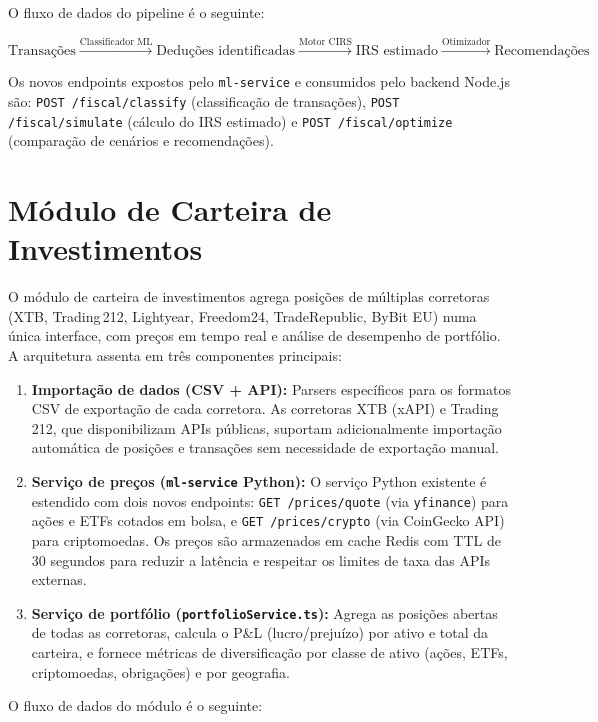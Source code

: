O fluxo de dados do pipeline é o seguinte:

\[
\text{Transações} \xrightarrow{\text{Classificador ML}} \text{Deduções identificadas} \xrightarrow{\text{Motor CIRS}} \text{IRS estimado} \xrightarrow{\text{Otimizador}} \text{Recomendações}
\]

Os novos endpoints expostos pelo \texttt{ml-service} e consumidos pelo backend Node.js são: \texttt{POST /fiscal/classify} (classificação de transações), \texttt{POST /fiscal/simulate} (cálculo do \ac{IRS} estimado) e \texttt{POST /fiscal/optimize} (comparação de cenários e recomendações).


\section{Módulo de Carteira de Investimentos}
\label{sec:arq-investimentos}

O módulo de carteira de investimentos agrega posições de múltiplas corretoras (XTB, Trading\,212, Lightyear, Freedom24, TradeRepublic, ByBit EU) numa única interface, com preços em tempo real e análise de desempenho de portfólio. A arquitetura assenta em três componentes principais:

\begin{enumerate}
    \item \textbf{Importação de dados (CSV + API):} Parsers específicos para os formatos CSV de exportação de cada corretora. As corretoras XTB (xAPI) e Trading\,212, que disponibilizam APIs públicas, suportam adicionalmente importação automática de posições e transações sem necessidade de exportação manual.
    \item \textbf{Serviço de preços (\texttt{ml-service} Python):} O serviço Python existente é estendido com dois novos endpoints: \texttt{GET /prices/quote} (via \texttt{yfinance}) para ações e ETFs cotados em bolsa, e \texttt{GET /prices/crypto} (via CoinGecko \ac{API}) para criptomoedas. Os preços são armazenados em cache Redis com TTL de 30 segundos para reduzir a latência e respeitar os limites de taxa das APIs externas.
    \item \textbf{Serviço de portfólio (\texttt{portfolioService.ts}):} Agrega as posições abertas de todas as corretoras, calcula o P\&L (lucro/prejuízo) por ativo e total da carteira, e fornece métricas de diversificação por classe de ativo (ações, ETFs, criptomoedas, obrigações) e por geografia.
\end{enumerate}

O fluxo de dados do módulo é o seguinte:

